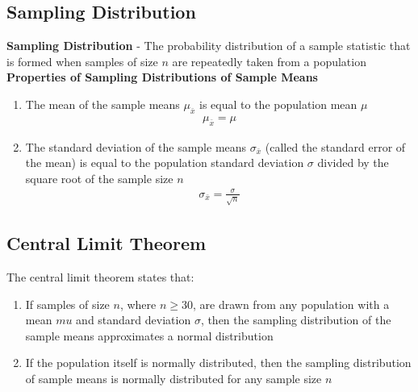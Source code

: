 \documentclass[a4paper]{article}
\let\bf\textbf
\begin{document}
\subsection{Sampling Distribution}
\bf{Sampling Distribution} - The probability distribution of a sample statistic that is formed when samples of size $n$ are repeatedly taken from a population
\vspace{1mm}\\
\bf{Properties of Sampling Distributions of Sample Means}
\begin{enumerate}
    \item The mean of the sample means $\mu_{\bar{x}}$ is equal to the population mean $\mu$
    \begin{align}
        \mu_{\bar{x}} = \mu
    \end{align}
    \item The standard deviation of the sample means $\sigma_{\bar{x}}$ (called the standard error of the mean) is equal to the population standard deviation $\sigma$ divided by the square root of the sample size $n$
    \begin{align}
        \sigma_{\bar{x}} = \frac{\sigma}{\sqrt{n}}
    \end{align}
\end{enumerate}
\subsection{Central Limit Theorem}
The central limit theorem states that:
\begin{enumerate}
    \item If samples of size $n$, where $n \geq 30$, are drawn from any population with a mean $mu$ and standard deviation $\sigma$, then the sampling distribution of the sample means approximates a normal distribution
    \item If the population itself is normally distributed, then the sampling distribution of sample means is normally distributed for any sample size $n$
\end{enumerate}
\end{document}
